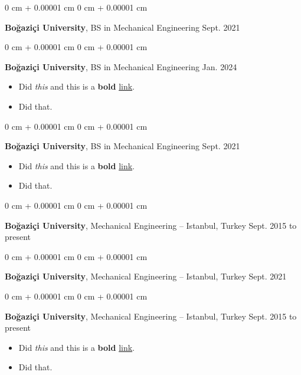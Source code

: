 \documentclass[10pt, letterpaper]{article}
\newenvironment{highlights}{
    \begin{itemize}[
        topsep=0.10 cm,
        parsep=0.10 cm,
        partopsep=0pt,
        itemsep=0pt,
        leftmargin=0 cm + 10pt
    ]
}{
    \end{itemize}
        
    \vspace{-0.20cm}
} %
\newenvironment{onecolentry}{
    \begin{adjustwidth}{
        0 cm + 0.00001 cm
    }{
        0 cm + 0.00001 cm
    }
}{
    \end{adjustwidth}
} %
\begin{document}
        \begin{onecolentry}
            \textbf{Boğaziçi University}, BS in Mechanical Engineering \hfill Sept. 2021
        \end{onecolentry}

        \vspace{0.1 cm}

        \begin{onecolentry}
            \textbf{Boğaziçi University}, BS in Mechanical Engineering \hfill Jan. 2024
            \begin{highlights}
                \item Did \textit{this} and this is a \textbf{bold} \href{https://example.com}{link}.
                \item Did that.
            \end{highlights}
        \end{onecolentry}

        \vspace{0.1 cm}

        \begin{onecolentry}
            \textbf{Boğaziçi University}, BS in Mechanical Engineering \hfill Sept. 2021
            \begin{highlights}
                \item Did \textit{this} and this is a \textbf{bold} \href{https://example.com}{link}.
                \item Did that.
            \end{highlights}
        \end{onecolentry}

        \vspace{0.1 cm}

        \begin{onecolentry}
            \textbf{Boğaziçi University}, Mechanical Engineering -- Istanbul, Turkey \hfill Sept. 2015 to present
        \end{onecolentry}

        \vspace{0.1 cm}

        \begin{onecolentry}
            \textbf{Boğaziçi University}, Mechanical Engineering -- Istanbul, Turkey \hfill Sept. 2021
        \end{onecolentry}

        \vspace{0.1 cm}

        \begin{onecolentry}
            \textbf{Boğaziçi University}, Mechanical Engineering -- Istanbul, Turkey \hfill Sept. 2015 to present
            \begin{highlights}
                \item Did \textit{this} and this is a \textbf{bold} \href{https://example.com}{link}.
                \item Did that.
            \end{highlights}
        \end{onecolentry}
\end{document}
